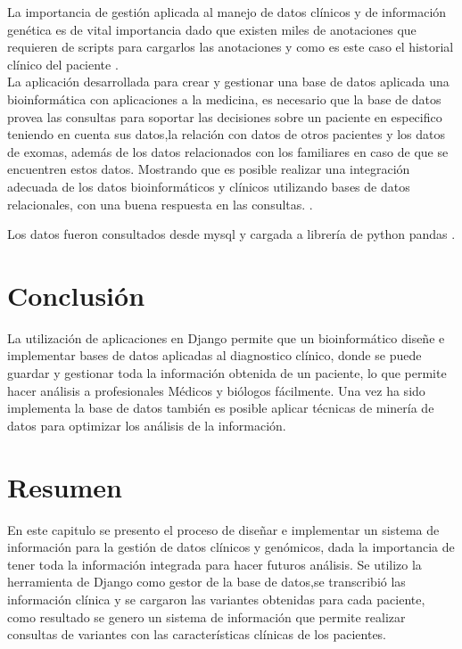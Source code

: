 La importancia de gestión aplicada al manejo de datos clínicos y de información genética es de vital importancia dado que existen miles de anotaciones que requieren de scripts para cargarlos las anotaciones y como es este caso el historial clínico del paciente \cite{Paila2013}. \\

La aplicación desarrollada para crear y gestionar una base de datos aplicada una bioinformática con aplicaciones a la medicina, es necesario que la base de datos provea las consultas para soportar las decisiones sobre un paciente en especifico teniendo en cuenta sus datos,la relación con datos de otros pacientes y los datos de exomas, además de los datos relacionados con los familiares en caso de que se encuentren estos datos. Mostrando que es posible realizar una integración adecuada de los datos bioinformáticos y clínicos utilizando bases de datos relacionales, con una buena respuesta en las consultas. \cite{Sujansky2001}.

Los datos fueron consultados  desde mysql y cargada a librería de python pandas \cite{mckinneypandas}.

\section{Conclusión}

La utilización de aplicaciones en Django permite que un bioinformático diseñe e implementar bases de datos aplicadas al diagnostico clínico, donde se puede guardar y gestionar toda la información obtenida de un paciente, lo que permite hacer análisis a profesionales Médicos y biólogos fácilmente. Una vez ha sido implementa la base de datos también es posible aplicar técnicas de minería de datos para optimizar los análisis de la información. \\

\section*{Resumen}

En este capitulo se presento el proceso de diseñar e implementar un sistema de información para la gestión de datos clínicos y genómicos, dada la importancia de tener toda la información integrada para hacer futuros análisis. Se utilizo la herramienta de Django como gestor de la base de datos,se transcribió las información clínica y se cargaron las variantes obtenidas para cada paciente, como resultado se genero un sistema de información que permite realizar consultas de variantes con las características clínicas de los pacientes.   